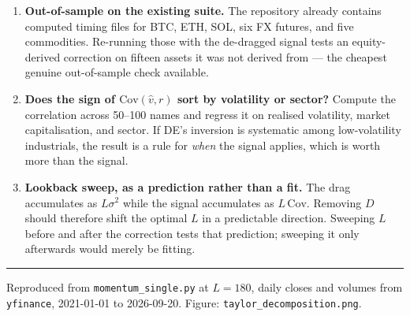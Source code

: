 \documentclass[11pt,a4paper]{article}
\newcommand{\vhat}{\hat{v}}
\begin{document}
\begin{enumerate}[leftmargin=1.4em]
\item \textbf{Out-of-sample on the existing suite.} The repository already contains computed
timing files for BTC, ETH, SOL, six FX futures, and five commodities. Re-running those with
the de-dragged signal tests an equity-derived correction on fifteen assets it was not derived
from --- the cheapest genuine out-of-sample check available.
\item \textbf{Does the sign of $\mathrm{Cov}(\vhat,r)$ sort by volatility or sector?}
Compute the correlation across 50--100 names and regress it on realised volatility, market
capitalisation, and sector. If DE's inversion is systematic among low-volatility industrials,
the result is a rule for \emph{when} the signal applies, which is worth more than the signal.
\item \textbf{Lookback sweep, as a prediction rather than a fit.} The drag accumulates as
$L\sigma^2$ while the signal accumulates as $L\,\mathrm{Cov}$. Removing $D$ should therefore
shift the optimal $L$ in a predictable direction. Sweeping $L$ before and after the
correction tests that prediction; sweeping it only afterwards would merely be fitting.
\end{enumerate}

\vspace{1em}
\hrule
\vspace{0.5em}
{\footnotesize Reproduced from \texttt{momentum\_single.py} at $L = 180$, daily closes and
volumes from \texttt{yfinance}, 2021-01-01 to 2026-09-20. Figure:
\texttt{taylor\_decomposition.png}.}
\end{document}
